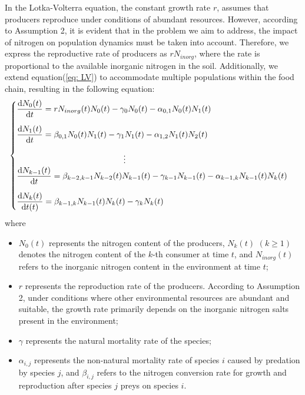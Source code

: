 \documentclass{mcmthesis}
\begin{document}
In the Lotka-Volterra equation, the constant growth rate $r$, assumes that producers reproduce under conditions of abundant resources. However, according to Assumption 2, it is evident that in the problem we aim to address, the impact of nitrogen on population dynamics must be taken into account. Therefore, we express the reproductive rate of producers as $rN_{inorg}$, where the rate is proportional to the available inorganic nitrogen in the soil. Additionally, we extend equation(\ref{eq: LV}) to accommodate multiple populations within the food chain, resulting in the following equation:
\begin{align}
    \begin{cases}
	\displaystyle \vspace{10pt}
    \frac{\mathrm{d}N_0(t)}{\mathrm{d}t}=rN_{inorg}(t)N_0(t)-\gamma _0N_0(t)-\alpha _{0,1}N_0(t)N_1(t)\\
	\displaystyle \vspace{10pt}
    \frac{\mathrm{d}N_1(t)}{\mathrm{d}t}=\beta _{0,1}N_0(t)N_1(t)-\gamma _1N_1(t)-\alpha _{1,2}N_1(t)N_2(t)\\
    \quad\quad\quad\quad\quad\quad\quad\quad\quad \quad\quad\quad\quad\vdots\\
	\displaystyle \vspace{10pt}
    \frac{\mathrm{d}N_{k-1}(t)}{\mathrm{d}t}=\beta _{k-2,k-1}N_{k-2}(t)N_{k-1}(t)-\gamma _{k-1}N_{k-1}(t)-\alpha _{k-1,k}N_{k-1}(t)N_k(t)\\
	\displaystyle
    \frac{\mathrm{d}N_k(t)}{\mathrm{d}t(t)}=\beta _{k-1,k}N_{k-1}(t)N_k(t)-\gamma _kN_k(t)\\
\end{cases}
\label{eq:forest_food_chain}
\end{align}
where
\begin{itemize} 
\item $N_0(t)$ represents the nitrogen content of the producers, $N_k(t)$ $(k \geq 1)$ denotes the nitrogen content of the $k$-th consumer at time $t$, and $N_{inorg}(t)$ refers to the inorganic nitrogen content in the environment at time $t$;
\item $r$ represents the reproduction rate of the producers. According to Assumption 2, under conditions where other environmental resources are abundant and suitable, the growth rate primarily depends on the inorganic nitrogen salts present in the environment; 
\item $\gamma$ represents the natural mortality rate of the species; 
\item $\alpha_{i,j}$ represents the non-natural mortality rate of species $i$ caused by predation by species $j$, and $\beta_{i,j}$ refers to the nitrogen conversion rate for growth and reproduction after species $j$ preys on species $i$. 
\end{itemize}
\end{document}
